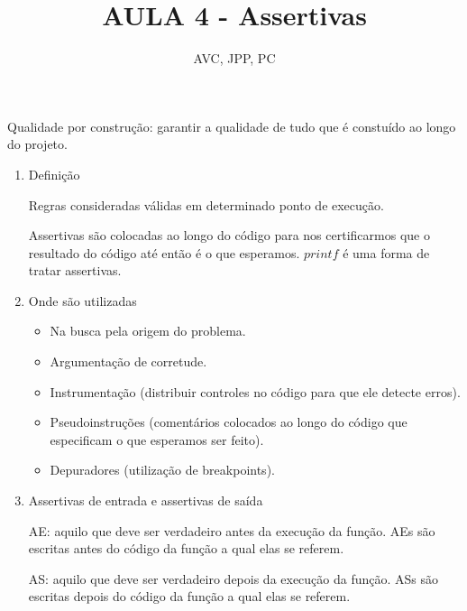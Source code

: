 \documentclass[
	12pt, %
]{fphw}
\title{AULA 4 - Assertivas} %
\author{AVC, JPP, PC} %
\date{} %
\institute{Pontifícia Universidade Católica do Rio de Janeiro \\ Departamento de Informática} %
\begin{document}
\maketitle %

\begin{doublespace}

Qualidade por construção: garantir a qualidade de tudo que é constuído ao longo do projeto.

\begin{enumerate}

    \item Definição
    
    Regras consideradas válidas em determinado ponto de execução.

    Assertivas são colocadas ao longo do código para nos certificarmos que o resultado do código até então é o que esperamos. $printf$ é uma forma de tratar assertivas.
    
    \item Onde são utilizadas

    \begin{itemize}

        \item Na busca pela origem do problema.
        \item Argumentação de corretude.
        \item Instrumentação (distribuir controles no código para que ele detecte erros).
        \item Pseudoinstruções (comentários colocados ao longo do código que especificam o que esperamos ser feito).
        \item Depuradores (utilização de breakpoints).
        
    \end{itemize}

    \item Assertivas de entrada e assertivas de saída
    
    AE: aquilo que deve ser verdadeiro antes da execução da função. AEs são escritas antes do código da função a qual elas se referem.

    AS: aquilo que deve ser verdadeiro depois da execução da função. ASs são escritas depois do código da função a qual elas se referem.


\end{enumerate}
\end{doublespace}
\end{document}
